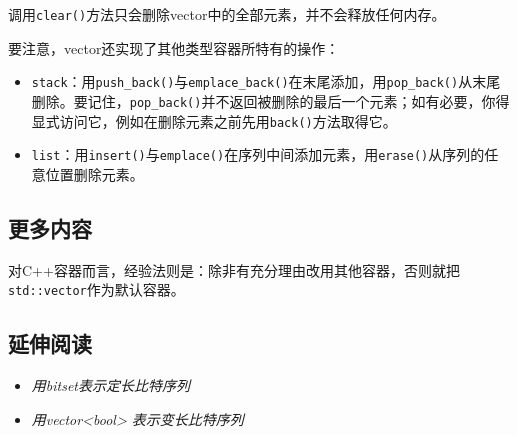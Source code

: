 
调用\texttt{clear()}方法只会删除vector中的全部元素，并不会释放任何内存。



要注意，vector还实现了其他类型容器所特有的操作：



\begin{itemize}
\item \texttt{stack}：用\texttt{push\_\allowbreak{}back()}与\texttt{emplace\_\allowbreak{}back()}在末尾添加，用\texttt{pop\_\allowbreak{}back()}从末尾删除。要记住，\texttt{pop\_\allowbreak{}back()}并不返回被删除的最后一个元素；如有必要，你得显式访问它，例如在删除元素之前先用\texttt{back()}方法取得它。



\item \texttt{list}：用\texttt{insert()}与\texttt{emplace()}在序列中间添加元素，用\texttt{erase()}从序列的任意位置删除元素。

\end{itemize}



\subsection{更多内容}



\begin{myNote}
对C++容器而言，经验法则是：除非有充分理由改用其他容器，否则就把\texttt{std::\allowbreak{}vector}作为默认容器。
\end{myNote}



\subsection{延伸阅读}



\begin{itemize}
\item \textit{用bitset表示定长比特序列}



\item \textit{用vector<bool> 表示变长比特序列}

\end{itemize}



